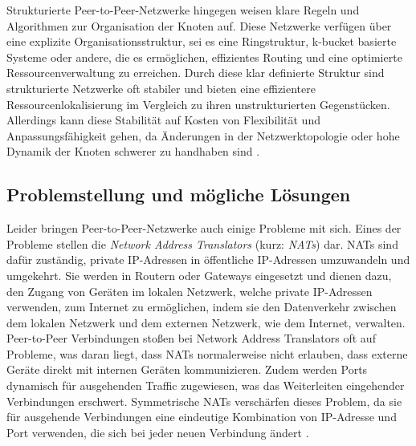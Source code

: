 Strukturierte Peer-to-Peer-Netzwerke hingegen weisen klare Regeln und Algorithmen zur Organisation der Knoten auf. Diese Netzwerke verfügen über eine explizite Organisationsstruktur, sei es eine Ringstruktur, k-bucket basierte Systeme oder andere, die es ermöglichen, effizientes Routing und eine optimierte Ressourcenverwaltung zu erreichen. Durch diese klar definierte Struktur sind strukturierte Netzwerke oft stabiler und bieten eine effizientere Ressourcenlokalisierung im Vergleich zu ihren unstrukturierten Gegenstücken. Allerdings kann diese Stabilität auf Kosten von Flexibilität und Anpassungsfähigkeit gehen, da Änderungen in der Netzwerktopologie oder hohe Dynamik der Knoten schwerer zu handhaben sind \parencite[S. 40]{Vu_P2PComputing}.


\subsection{Problemstellung und mögliche Lösungen}
\label{subsec:problemstellung_und_moegliche_loesungen}

Leider bringen Peer-to-Peer-Netzwerke auch einige Probleme mit sich. Eines der Probleme stellen die \textit{Network Address Translators} (kurz: \textit{NATs}) dar. NATs sind dafür zuständig, private IP-Adressen in öffentliche IP-Adressen umzuwandeln und umgekehrt. Sie werden in Routern oder Gateways eingesetzt und dienen dazu, den Zugang von Geräten im lokalen Netzwerk, welche private IP-Adressen verwenden, zum Internet zu ermöglichen, indem sie den Datenverkehr zwischen dem lokalen Netzwerk und dem externen Netzwerk, wie dem Internet, verwalten. Peer-to-Peer Verbindungen stoßen bei Network Address Translators oft auf Probleme, was daran liegt, dass NATs normalerweise nicht erlauben, dass externe Geräte direkt mit internen Geräten kommunizieren. Zudem werden Ports dynamisch für ausgehenden Traffic zugewiesen, was das Weiterleiten eingehender Verbindungen erschwert. Symmetrische NATs verschärfen dieses Problem, da sie für ausgehende Verbindungen eine eindeutige Kombination von IP-Adresse und Port verwenden, die sich bei jeder neuen Verbindung ändert \Parencite[S. 1-9]{rfc2663_NAT_Terminology}.


